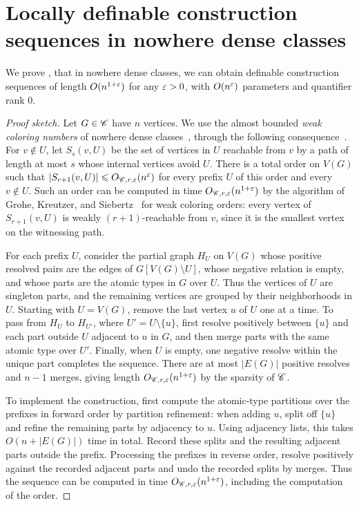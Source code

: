 \section{Locally definable construction sequences in nowhere dense classes}\label{sec:nd}
We prove , that in nowhere dense classes, we can obtain definable construction sequences of length $O(n^{1+\varepsilon})$ for any $\varepsilon>0$, with $O(n^\varepsilon)$ parameters and quantifier rank $0$.


\thmnddefseq*

\begin{proof}[Proof sketch]
Let $G\in\mathscr C$ have $n$ vertices.
We use the almost bounded \emph{weak coloring numbers} of nowhere dense classes~\cite{NesetrilM11a,gks}, through the following consequence~\cite{drabik2026flips}.
For $v\notin U$, let $S_s(v,U)$ be the set of vertices in $U$ reachable from $v$ by a path of length at most $s$ whose internal vertices avoid $U$.
There is a total order on $V(G)$ such that $|S_{r+1}(v,U)|\leqslant O_{\mathscr C,r,\varepsilon}(n^\varepsilon)$ for every prefix $U$ of this order and every $v\notin U$.
Such an order can be computed in time $O_{\mathscr C,r,\varepsilon}(n^{1+\varepsilon})$ by the algorithm of Grohe, Kreutzer, and Siebertz~\cite{gks} for weak coloring orders: every vertex of $S_{r+1}(v,U)$ is weakly $(r+1)$-reachable from $v$, since it is the smallest vertex on the witnessing path.

For each prefix $U$, consider the partial graph $H_U$ on $V(G)$ whose positive resolved pairs are the edges of $G[V(G)\setminus U]$, whose negative relation is empty, and whose parts are the atomic types in $G$ over $U$.
Thus the vertices of $U$ are singleton parts, and the remaining vertices are grouped by their neighborhoods in $U$.
Starting with $U=V(G)$, remove the last vertex $u$ of $U$ one at a time.
To pass from $H_U$ to $H_{U'}$, where $U'=U\setminus\{u\}$, first resolve positively between $\{u\}$ and each part outside $U$ adjacent to $u$ in $G$, and then merge parts with the same atomic type over $U'$.
Finally, when $U$ is empty, one negative resolve within the unique part completes the sequence.
There are at most $|E(G)|$ positive resolves and $n-1$ merges, giving length $O_{\mathscr C,r,\varepsilon}(n^{1+\varepsilon})$ by the sparsity of $\mathscr C$.

To implement the construction, first compute the atomic-type partitions over the prefixes in forward order by partition refinement: when adding $u$, split off $\{u\}$ and refine the remaining parts by adjacency to $u$.
Using adjacency lists, this takes $O(n+|E(G)|)$ time in total.
Record these splits and the resulting adjacent parts outside the prefix.
Processing the prefixes in reverse order, resolve positively against the recorded adjacent parts and undo the recorded splits by merges.
Thus the sequence can be computed in time $O_{\mathscr C,r,\varepsilon}(n^{1+\varepsilon})$, including the computation of the order.


\end{proof}
